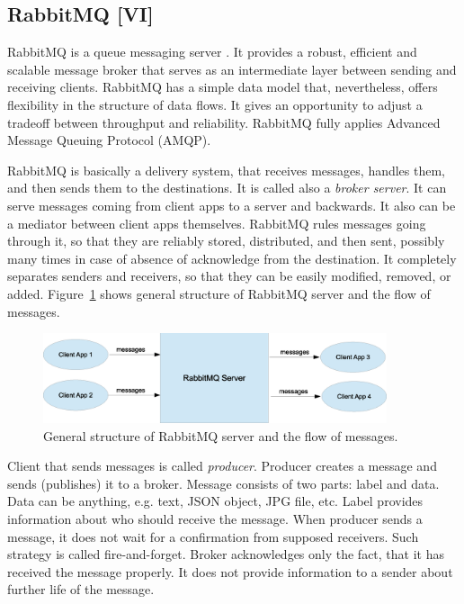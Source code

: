 \subsection{RabbitMQ [VI]}

RabbitMQ is a queue messaging server \cite{RabbitMQ, AlvaroWilliams2012}.
It provides a robust, efficient and scalable message broker that serves as an intermediate layer between sending and receiving clients.
RabbitMQ has a simple data model that, nevertheless, offers flexibility in the structure of data flows.
It gives an opportunity to adjust a tradeoff between throughput and reliability.
RabbitMQ fully applies Advanced Message Queuing Protocol (AMQP).

RabbitMQ is basically a delivery system, that receives messages, handles them, and then sends them to the destinations.
It is called also a \textit{broker server}.
It can serve messages coming from client apps to a server and backwards.
It also can be a mediator between client apps themselves.
RabbitMQ rules messages going through it, so that they are reliably stored, distributed, and then sent, possibly many times in case of absence of acknowledge from the destination.
It completely separates senders and receivers, so that they can be easily modified, removed, or added.
Figure~\ref{fig:RabbitMQGeneralStructure} shows general structure of RabbitMQ server and the flow of messages.

\begin{figure}[h]
  \centering
  \includegraphics [width=0.9\textwidth]{images/RabbitMQGeneralStructure}
  \caption{General structure of RabbitMQ server and the flow of messages.}
  \label{fig:RabbitMQGeneralStructure}
\end{figure}

Client that sends messages is called \textit{producer}.
Producer creates a message and sends (publishes) it to a broker.
Message consists of two parts: label and data.
Data can be anything, e.g. text, JSON object, JPG file, etc.
Label provides information about who should receive the message.
When producer sends a message, it does not wait for a confirmation from supposed receivers.
Such strategy is called fire-and-forget.
Broker acknowledges only the fact, that it has received the message properly.
It does not provide information to a sender about further life of the message. 


